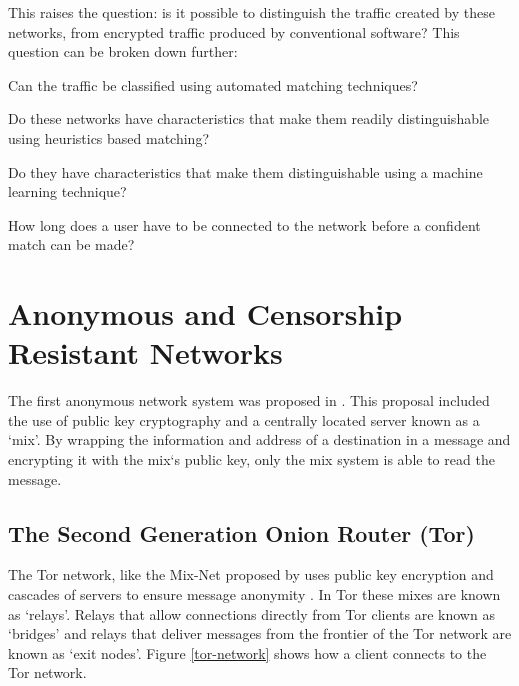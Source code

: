 \documentclass{conference}
\begin{document}
This raises the question: is it possible to distinguish the traffic created by these networks, from encrypted traffic produced by conventional software? This question can be broken down further:

\begin{enumerate*}
\item Can the traffic be classified using automated matching techniques?
\item Do these networks have characteristics that make them readily distinguishable using heuristics based matching?
\item Do they have characteristics that make them distinguishable using a machine learning technique?
\item How long does a user have to be connected to the network before a confident match can be made?
\end{enumerate*}

\section{Anonymous and Censorship Resistant Networks}

The first anonymous network system was proposed in \citet{Chaum:1981p296}. This proposal included the use of public key cryptography and a centrally located server known as a `mix'. By wrapping the information and address of a destination in a message and encrypting it with the mix`s public key, only the mix system is able to read the message.

\subsection{The Second Generation Onion Router (Tor)}

The Tor network, like the Mix-Net proposed by \citet{Chaum:1981p296} uses public key encryption and cascades of servers to ensure message anonymity \citep{Dingledine:2004p314}. In Tor these mixes are known as ‘relays’. Relays that allow connections directly from Tor clients are known as ‘bridges’ and relays that deliver messages from the frontier of the Tor network are known as ‘exit nodes’. Figure \ref{tor-network} shows how a client connects to the Tor network.
\end{document}
